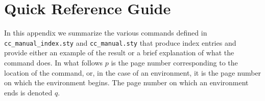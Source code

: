\clearpage
\appendix
\section{Quick Reference Guide}
\newcommand{\Indent}{\hspace*{15pt}}

\normalsize
In this appendix we summarize the various commands defined in
{\tt cc\_manual\_index.sty} and {\tt cc\_manual.sty} that produce
index entries and provide either an example of the result or a
brief explanation of what the command does.  In what follows $p$ is the
page number corresponding to the location of the command, or, in the case
of an environment, it is the page number on which the environment begins.
The page number on which an environment ends is denoted $q$.

\small
{}
\tabletail{\hline}


